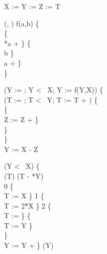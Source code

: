 \begin{algorithm}

	\Integer{} X  := \;
	\Integer{} Y  := \;
	\Integer{} Z  := \;
	\Integer{} T \;
	
	(, ) f(a,b) \{ \\
	\quad {} \{\\
	\quad \quad {} *a + \;
	\quad \}  \{\\
	\quad \quad {} b\;
	\quad \} \Elsee{}\\
	\quad \quad {} a + \;
	\quad \} \\
	\}\;

     (Y := ; Y < \, X; Y := f(Y,X))	 \{ \\
    \quad {} 
    (T := ; T < \, Y; T := T + )	 \{ \\
	\quad \quad {} \{\\
	\quad \quad \quad Z := Z + \;
	\quad \quad \} \\
	\quad \} \\
	\}\\
	
	
	\Integer{} Y  := X - Z\;
	
	 (Y < \, X)	 \{ \\
	\quad {}(T)\;
	\quad {}(T - *Y)\\
	\quad \quad {} 0 \{ \\
	\quad \quad \quad T := X\;
	\quad \quad\}  1 \{ \\
	\quad \quad \quad T := 2*X\;
	\quad \quad\}  2 \{ \\
	\quad \quad \quad T := \;
	\quad \quad\}  \{ \\
	\quad \quad \quad T := Y\;
	\quad \quad\}\\
	\quad \} \\
	\quad Y := Y + \;
	\}\;
	(Y)\;
\end{algorithm}

	
